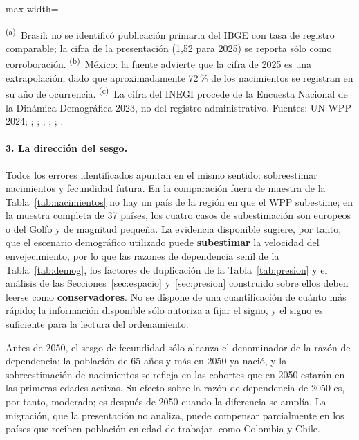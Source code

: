 \documentclass[12pt, letterpaper]{article}
\begin{document}
\begin{table}[htbp]
  \centering
  \caption{Tasa global de fecundidad: WPP 2024 frente a registros vitales
  nacionales (hijos por mujer).}
  \label{tab:contraste}
  \small
  \begin{adjustbox}{max width=\textwidth}
  
  \end{adjustbox}

  \vspace{2pt}
  \footnotesize
  \textsuperscript{(a)}~Brasil: no se identificó publicación primaria del IBGE con
  tasa de registro comparable; la cifra de la presentación (1,52 para 2025) se
  reporta sólo como corroboración. \textsuperscript{(b)}~México: la fuente advierte
  que la cifra de 2025 es una extrapolación, dado que aproximadamente 72\,\% de los
  nacimientos se registran en su año de ocurrencia. \textsuperscript{(c)}~La cifra
  del INEGI procede de la Encuesta Nacional de la Dinámica Demográfica 2023, no del
  registro administrativo. Fuentes: UN WPP 2024; \citet{fv2026}; \citet{ine2025};
  \citet{dane2025}; \citet{ineccr2025}; \citet{inegi2024}; \citet{inecpan2025}.
\end{table}

\paragraph{3. La dirección del sesgo.} Todos los errores identificados apuntan en
el mismo sentido: sobreestimar nacimientos y fecundidad futura. En la comparación fuera de muestra de la
Tabla~\ref{tab:nacimientos} no hay un país de la región en que el WPP subestime;
en la muestra completa de 37 países, los cuatro casos de subestimación son
europeos o del Golfo y de magnitud pequeña. La evidencia disponible sugiere, por
tanto, que el escenario demográfico utilizado puede \textbf{subestimar} la
velocidad del envejecimiento, por lo que las razones de dependencia senil de la
Tabla~\ref{tab:demog}, los factores de duplicación de la Tabla~\ref{tab:presion}
y el análisis de las Secciones~\ref{sec:espacio} y~\ref{sec:presion} construido
sobre ellos deben leerse como \textbf{conservadores}. No se dispone de una
cuantificación de cuánto más rápido; la información disponible sólo autoriza a
fijar el signo, y el signo es suficiente para la lectura del ordenamiento.

Antes de 2050, el sesgo de fecundidad sólo alcanza el denominador de la razón de
dependencia: la población de 65 años y más en 2050 ya nació, y la sobreestimación
de nacimientos se refleja en las cohortes que en 2050 estarán en las primeras
edades activas. Su efecto sobre la razón de dependencia de 2050 es, por tanto,
moderado; es después de 2050 cuando la diferencia se amplía. La migración, que la
presentación no analiza, puede compensar parcialmente en los países que reciben
población en edad de trabajar, como Colombia y Chile.
\end{document}
